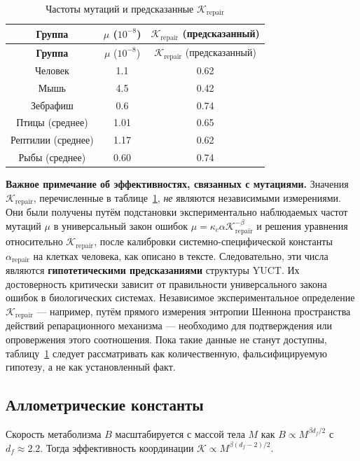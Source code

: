 \documentclass[12pt,a4paper]{article}
\newcommand{\REL}{\mathcal{K}}          %
\begin{document}
	\begin{longtable}{|c|c|c|}
		\caption{Частоты мутаций и предсказанные \(\REL_{\mathrm{repair}}\)}\label{tab:mutations}\\
		\hline
		\textbf{Группа} & \(\mu\) (\(10^{-8}\)) & \(\REL_{\mathrm{repair}}\) (предсказанный) \\
		\hline
		\endfirsthead
		\hline
		\textbf{Группа} & \(\mu\) (\(10^{-8}\)) & \(\REL_{\mathrm{repair}}\) (предсказанный) \\
		\hline
		\endhead
		\hline
		Человек & 1.1 & 0.62 \\
		Мышь & 4.5 & 0.42 \\
		Зебрафиш & 0.6 & 0.74 \\
		Птицы (среднее) & 1.01 & 0.65 \\
		Рептилии (среднее) & 1.17 & 0.62 \\
		Рыбы (среднее) & 0.60 & 0.74 \\
		\hline
	\end{longtable}
	
	\noindent\textbf{Важное примечание об эффективностях, связанных с мутациями.}
	Значения \(\REL_{\mathrm{repair}}\), перечисленные в таблице~\ref{tab:mutations}, \emph{не} являются независимыми измерениями.
	Они были получены путём подстановки экспериментально наблюдаемых частот мутаций \(\mu\) в универсальный закон ошибок \(\mu = \kappa_c \alpha \REL_{\mathrm{repair}}^{-\beta}\) и решения уравнения относительно \(\REL_{\mathrm{repair}}\), после калибровки системно-специфической константы \(\alpha_{\mathrm{repair}}\) на клетках человека, как описано в тексте.
	Следовательно, эти числа являются \textbf{гипотетическими предсказаниями} структуры YUCT.
	Их достоверность критически зависит от правильности универсального закона ошибок в биологических системах.
	Независимое экспериментальное определение \(\REL_{\mathrm{repair}}\) — например, путём прямого измерения энтропии Шеннона пространства действий репарационного механизма — необходимо для подтверждения или опровержения этого соотношения.
	Пока такие данные не станут доступны, таблицу~\ref{tab:mutations} следует рассматривать как количественную, фальсифицируемую гипотезу, а не как установленный факт.
	
	\subsection{Аллометрические константы}
	\label{sec:allometry}
	Скорость метаболизма \(B\) масштабируется с массой тела \(M\) как \(B\propto M^{\beta d_f/2}\) с \(d_f\approx2.2\). Тогда эффективность координации \(\REL \propto M^{\beta(d_f-2)/2}\).
	
\end{document}
